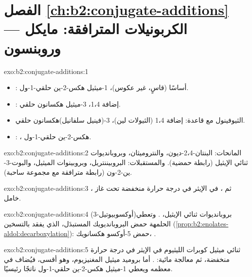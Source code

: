 \section*{الفصل \ref{ch:b2:conjugate-additions} --- الكربونيلات المترافقة: مايكل وروبنسون}

\begin{solution}{exo:b2:conjugate-additions:1}
\begin{itemize}
  \item {}:  أساسًا (قاسٍ، غير عكوس)، 1-ميثيل هكس-2-ين حلقي-1-ول.
  \item {}: إضافة 1،4، 3-ميثيل هكسانون حلقي.
  \item الثيوفينول مع قاعدة: إضافة 1،4 (الثيولات لين)، 3-(فينيل سلفانيل)هكسانون حلقي.
  \item {}: ، هكس-2-ين حلقي-1-ول.
\end{itemize}
\end{solution}

\begin{solution}{exo:b2:conjugate-additions:2}
المانحات: البنتان-2،4-ديون، والنتروميثان، وبروبانديوات ثنائي الإيثيل (رابطة  حمضية). والمستقبلات:
البروبيننتريل، وبروبينوات الميثيل، والبوت-3-ين-2-ون (رابطة  مترافقة مع مجموعة ساحبة).
\end{solution}

\begin{solution}{exo:b2:conjugate-additions:3}
، ثم ، في الإيثر في درجة حرارة
منخفضة تحت غاز خامل.
\end{solution}

\begin{solution}{exo:b2:conjugate-additions:4}
(3-أوكسوبيوتيل)بروبانديوات ثنائي الإيثيل، . وتعطي الحلمهة حمض
البروبانديويك المستبدَل، الذي يفقد  بالتسخين (\cref{prop:b2:enolates-aldol:decarboxylation}):
حمض 5-أوكسو هكسانويك، .
\end{solution}

\begin{solution}{exo:b2:conjugate-additions:5}
ثنائي ميثيل كوبرات الليثيوم في الإيثر في درجة حرارة منخفضة، ثم معالجة مائية: .
أما بروميد ميثيل المغنيزيوم، وهو أقسى، فيُضاف في معظمه  ويعطي 1-ميثيل هكس-2-ين حلقي-1-ول ناتجًا
رئيسيًا.
\end{solution}

